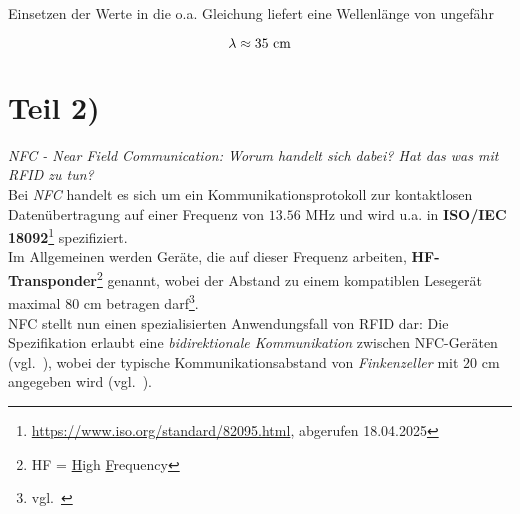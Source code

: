 \noindent
Einsetzen der Werte in die o.a. Gleichung liefert eine Wellenlänge von ungefähr

\begin{equation}\notag
\lambda \approx 35\ \text{cm}
\end{equation}


\section{Teil 2)}

\textit{NFC - Near Field Communication: Worum handelt sich dabei? Hat das was mit RFID zu tun?}\\


\noindent
Bei \textit{NFC} handelt es sich um ein Kommunikationsprotokoll zur kontaktlosen Datenübertragung auf einer Frequenz von $13.56$ MHz und wird u.a. in \textbf{ISO/IEC 18092}\footnote{
    \url{https://www.iso.org/standard/82095.html}, abgerufen 18.04.2025
} spezifiziert.\\

\noindent
Im Allgemeinen werden Geräte, die auf dieser Frequenz arbeiten, \textbf{HF-Transponder}\footnote{HF = \underline{H}igh \underline{F}requency} genannt, wobei der Abstand zu einem kompatiblen Lesegerät maximal $80$ cm betragen darf\footnote{vgl.~\cite[137]{ES5}}.\\

\noindent
NFC stellt nun einen spezialisierten Anwendungsfall von RFID dar: Die Spezifikation erlaubt eine \textit{bidirektionale Kommunikation} zwischen NFC-Geräten (vgl.~\cite[375 f.]{Fin10}), wobei der typische Kommunikationsabstand von \textit{Finkenzeller} mit $20$ cm angegeben wird (vgl.~\cite[57]{Fin10}).